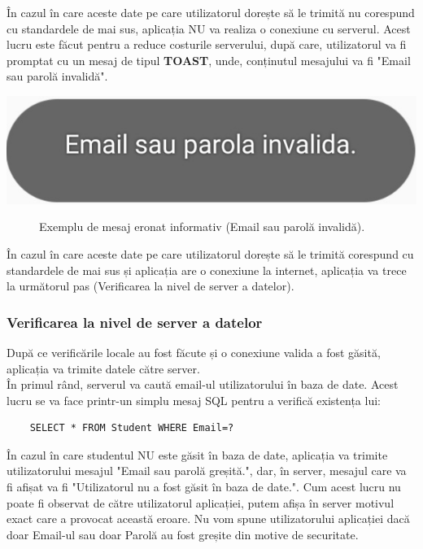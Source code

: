 \documentclass{article}
\begin{document}
		În cazul în care aceste date pe care utilizatorul dorește să le trimită nu corespund cu standardele de mai sus, aplicația NU va realiza o conexiune cu serverul. Acest lucru este făcut pentru a reduce costurile serverului, după care, utilizatorul va fi promptat cu un mesaj de tipul \textbf{TOAST}, unde, conținutul mesajului va fi "Email sau parolă invalidă". \\

	\begin{center}
		\includegraphics[scale=0.25]{Source/AplicatieEmailINVALID}
		\begin{figure}[!h]
			{\caption*{Exemplu de mesaj eronat informativ (Email sau parolă invalidă).}}
		\end{figure}
	\end{center}

		În cazul în care aceste date pe care utilizatorul dorește să le trimită corespund cu standardele de mai sus și aplicația are o conexiune la internet, aplicația va trece la următorul pas (Verificarea la nivel de server a datelor).

		\subsubsection*{Verificarea la nivel de server a datelor}
	După ce verificările locale au fost făcute și o conexiune valida a fost găsită, aplicația va trimite datele către server. \\

	În primul rând, serverul va caută email-ul utilizatorului în baza de date. Acest lucru se va face printr-un simplu mesaj SQL pentru a verifică existența lui:

	\begin{verbatim}
	SELECT * FROM Student WHERE Email=?
	\end{verbatim}
	
		În cazul în care studentul NU este găsit în baza de date, aplicația va trimite utilizatorului mesajul "Email sau parolă greșită.", dar, în server, mesajul care va fi afișat va fi "Utilizatorul nu a fost găsit în baza de date.". Cum acest lucru nu poate fi observat de către utilizatorul aplicației, putem afișa în server motivul exact care a provocat această eroare. Nu vom spune utilizatorului aplicației dacă doar Email-ul sau doar Parolă au fost greșite din motive de securitate.\\
\end{document}
